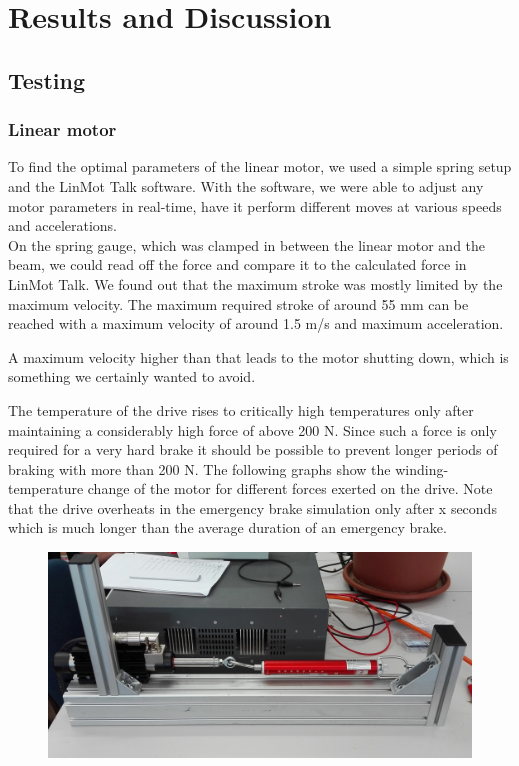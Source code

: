
\chapter{Results and Discussion}
\label{chp:Results}

\section{Testing}


\subsection{Linear motor}

To find the optimal parameters of the linear motor, we used a simple spring setup and the LinMot Talk software. With the software, we were able to adjust any motor parameters in real-time, have it perform different moves at various speeds and accelerations. \\On the spring gauge, which was clamped in between the linear motor and the beam, we could read off the force and compare it to the calculated force in LinMot Talk. We found out that the maximum stroke was mostly limited by the maximum velocity. The maximum required stroke of around 55 mm can be reached with a maximum velocity of around 1.5 m/s and maximum acceleration.
 
A maximum velocity higher than that leads to the motor shutting down, which is something we certainly wanted to avoid. 
  
The temperature of the drive rises to critically high temperatures only after maintaining a considerably high force of above 200 N. Since such a force is only required for a very hard brake it should be possible to prevent longer periods of braking with more than 200 N. The following graphs show the winding-temperature change of the motor for different forces exerted on the drive.
Note that the drive overheats in the emergency brake simulation only after x seconds which is much longer than the average duration of an emergency brake.

\begin{figure}[h]
	\centering
	\includegraphics[width=0.7\linewidth]{pictures_figures/Used/Picture_linmottest}
	\caption{}
	\label{fig:picturelinmottest}
\end{figure}



